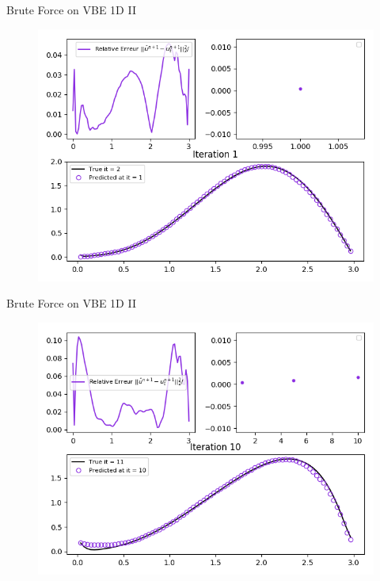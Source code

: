 \documentclass[10pt,
			   xcolor=svgnames,
			   hyperref={linkcolor=red, citecolor = DarkGreen, colorlinks=true, urlcolor=Navy}]{beamer}
\begin{document}
\begin{frame}{Brute Force on VBE 1D II}
	\begin{figure}[H]
	\centering
	\includegraphics[scale=0.5]{Pres_First_Iteration_2.png}
	\end{figure} 
\end{frame}

\begin{frame}{Brute Force on VBE 1D II}
	\begin{figure}[H]
	\centering
	\includegraphics[scale=0.5]{Pres_Tenth_Iteration_2.png}
	\end{figure} 
\end{frame}
\end{document}
